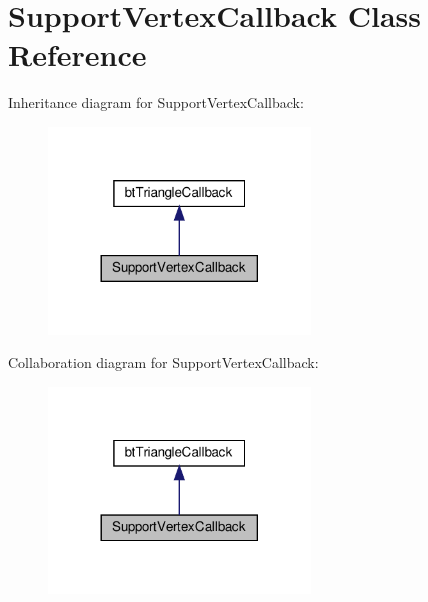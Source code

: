 \hypertarget{classSupportVertexCallback}{}\section{Support\+Vertex\+Callback Class Reference}
\label{classSupportVertexCallback}


Inheritance diagram for Support\+Vertex\+Callback\+:
\nopagebreak
\begin{figure}[H]
\begin{center}
\leavevmode
\includegraphics[width=197pt]{classSupportVertexCallback__inherit__graph}
\end{center}
\end{figure}


Collaboration diagram for Support\+Vertex\+Callback\+:
\nopagebreak
\begin{figure}[H]
\begin{center}
\leavevmode
\includegraphics[width=197pt]{classSupportVertexCallback__coll__graph}
\end{center}
\end{figure}
